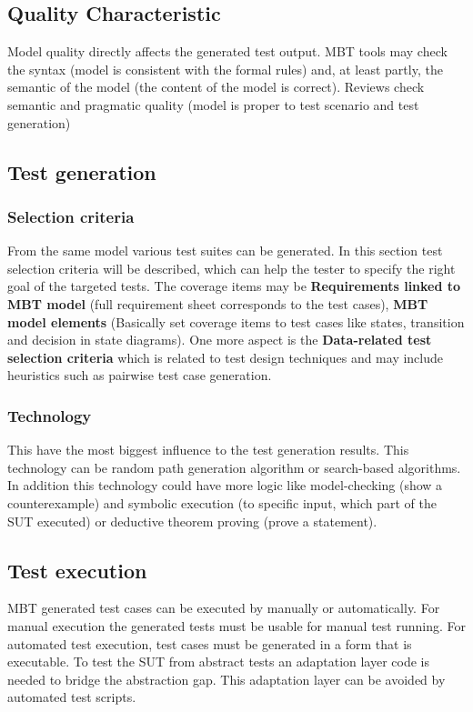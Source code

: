 \subsection{Quality Characteristic}
Model quality directly affects the generated test output. MBT tools may check the syntax (model is consistent with the formal rules) and, at least partly, the semantic of the model (the content of the model is correct). Reviews check semantic and pragmatic quality (model is proper to test scenario and test generation)

\subsection{Test generation}
\subsubsection{Selection criteria}
From the same model various test suites can be generated. In this section test selection criteria will be described, which can help the tester to specify the right goal of the targeted tests. The coverage items may be \textbf{Requirements linked to MBT model} (full requirement sheet corresponds to the test cases), \textbf{MBT model elements} (Basically set coverage items to test cases like states, transition and decision in state diagrams). One more aspect is the \textbf{Data-related test selection criteria} which is related to test design techniques and may include heuristics such as pairwise test case generation.

\subsubsection{Technology}
This have the most biggest influence to the test generation results. This technology can be random path generation algorithm or search-based algorithms. In addition this technology could have more logic like model-checking (show a counterexample) and symbolic execution (to specific input, which part of the SUT executed) or deductive theorem proving (prove a statement).


\subsection{Test execution}

MBT generated test cases can be executed by manually or automatically. For manual execution the generated tests must be usable for manual test running. For automated test execution, test cases must be generated in a form that is executable. To test the SUT from abstract tests an adaptation layer code is needed to bridge the abstraction gap. This adaptation layer can be avoided by automated test scripts.

